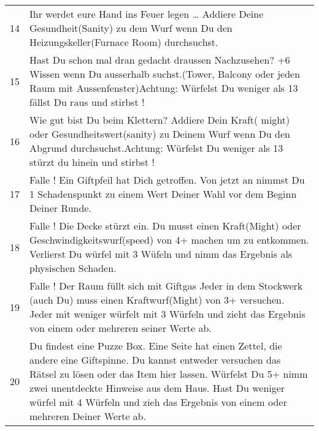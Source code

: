 
\newpage
\begin{tabular}{rp{7cm}}

{14} &
Ihr werdet eure Hand ins Feuer legen … Addiere Deine Gesundheit(Sanity) zu dem Wurf wenn Du den Heizungskeller(Furnace Room) durchsuchst. \\
{15} &
Hast Du schon mal dran gedacht draussen Nachzusehen? +6 Wissen wenn Du ausserhalb suchst.(Tower, Balcony oder jeden Raum mit Aussenfenster)Achtung: Würfelst Du weniger als 13 fällst Du raus und stirbst ! \\
{16} &
Wie gut bist Du beim Klettern? Addiere Dein Kraft( might) oder Gesundheitswert(sanity) zu Deinem Wurf wenn Du den Abgrund durchsuchst.Achtung: Würfelst Du weniger als 13 stürzt du hinein und stirbst ! \\
{17} &
Falle ! Ein Giftpfeil hat Dich getroffen. Von jetzt an nimmst Du 1 Schadenspunkt zu einem Wert Deiner Wahl vor dem Beginn Deiner Runde. \\
{18} &
Falle ! Die Decke stürzt ein. Du musst einen Kraft(Might) oder Geschwindigkeitswurf(speed) von 4+ machen um zu entkommen. Verlierst Du würfel mit 3 Wüfeln und nimm das Ergebnis als physischen Schaden. \\
{19} &
Falle ! Der Raum füllt sich mit Giftgas Jeder in dem Stockwerk (auch Du) muss einen Kraftwurf(Might) von 3+ versuchen. Jeder mit weniger würfelt mit 3 Würfeln und zieht das Ergebnis von einem oder mehreren seiner Werte ab. \\
{20} &
Du findest eine Puzze Box. Eine Seite hat einen Zettel, die andere eine Giftspinne. Du kannst entweder versuchen das Rätsel zu lösen oder das Item hier lassen. Würfelst Du 5+ nimm zwei unentdeckte Hinweise aus dem Haus. Hast Du weniger würfel mit 4 Würfeln und zieh das Ergebnis von einem oder mehreren Deiner Werte ab. \\

\end{tabular}



